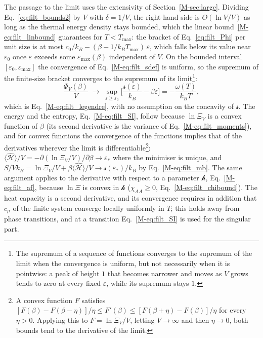\documentclass[10pt,a4paper]{article}
\theoremstyle{plain}
\theoremstyle{remark}
\newcommand{\hfield}{\mathscr{h}}  %
\newcommand{\lds}{\mathscr{s}}  %
\begin{document}
The passage to the limit uses the extensivity of Section~\ref{M-sec:large}.
Dividing Eq.~\eqref{eq:filt_bounds2} by $V$ with $\delta=1/V$, the right-hand
side is $O(\ln V/V)$ as long as the thermal energy density stays bounded,
which the linear bound~\eqref{M-eq:filt_linbound} guarantees for $T<T_{\max}$:
the bracket of Eq.~\eqref{eq:filt_Phi} per unit size is at most
$c_0/k_B-(\beta-1/k_BT_{\max})\,\varepsilon$, which falls below its value near
$\varepsilon_0$ once $\varepsilon$ exceeds some $\varepsilon_{\max}(\beta)$
independent of $V$. On the bounded interval
$[\varepsilon_0,\varepsilon_{\max}]$ the convergence of
Eq.~\eqref{M-eq:filt_sdef} is uniform, so the supremum of the finite-size
bracket converges to the supremum of its limit\footnote{The supremum of a
sequence of functions converges to the supremum of the limit when the
convergence is uniform, but not necessarily when it is pointwise: a peak of
height $1$ that becomes narrower and moves as $V$ grows tends to zero at
every fixed $\varepsilon$, while its supremum stays $1$.}:
\[
  \frac{\Phi_V(\beta)}{V}
  \;\longrightarrow\;\sup_{\varepsilon\ge\varepsilon_0}\Big[\frac{\lds(\varepsilon)}{k_B}-\beta\varepsilon\Big]
  =-\frac{\omega(T)}{k_BT} ,
\]
which is Eq.~\eqref{M-eq:filt_legendre}, with no assumption on the concavity
of $\lds$. The energy and the entropy, Eq.~\eqref{M-eq:filt_SI}, follow because
$\ln\Xi_V$ is a convex function of $\beta$ (its second derivative is the
variance of Eq.~\eqref{M-eq:filt_moments}), and for convex functions the
convergence of the functions implies that of the derivatives wherever the
limit is differentiable\footnote{A convex function $F$ satisfies
$[F(\beta)-F(\beta-\eta)]/\eta\le F'(\beta)\le[F(\beta+\eta)-F(\beta)]/\eta$
for every $\eta>0$. Applying this to $F=\ln\Xi_V/V$, letting $V\to\infty$
and then $\eta\to0$, both bounds tend to the derivative of the limit.}:
$\langle\hat{\mathcal H}\rangle/V=-\partial(\ln\Xi_V/V)/\partial\beta\to\varepsilon_*$
where the minimiser is unique, and
$S/Vk_B=\ln\Xi_V/V+\beta\langle\hat{\mathcal H}\rangle/V\to \lds(\varepsilon_*)/k_B$
by Eq.~\eqref{M-eq:filt_mb}. The same argument applies to the derivative with
respect to a parameter $\hfield$, Eq.~\eqref{M-eq:filt_af}, because $\ln\Xi$ is
convex in $\hfield$ ($\chi_{AA}\ge0$, Eq.~\eqref{M-eq:filt_chibound}). The heat
capacity is a second derivative, and its convergence requires in addition
that $c_\mu$ of the finite system converge locally uniformly in $T$; this
holds away from phase transitions, and at a transition
Eq.~\eqref{M-eq:filt_SI} is used for the singular part.
\end{document}
